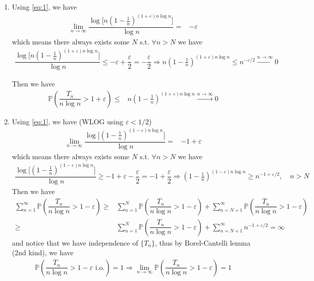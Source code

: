 \documentclass[11pt,a4paper]{article}
\numberwithin{equation}{section}%
\begin{document}
\begin{enumerate}[topsep=2pt,itemsep=0pt]
    \item Using \eqref{eq:1}, we have 
    \begin{align*}
        \lim_{n\to\infty } \dfrac{ \log \big[ n(1-\frac{1}{n})^{(1+\varepsilon  )n\log n} \big] }{ \log n } =& -\varepsilon 
    \end{align*}
    which means there always exists some $ N $ s.t. $ \forall n>N $ we have 
    \begin{align*}
        \dfrac{ \log \big[ n(1-\frac{1}{n})^{(1+\varepsilon  )n\log n} \big] }{ \log n } \leq -\varepsilon + \dfrac{ \varepsilon  }{ 2 } = -\dfrac{ \varepsilon  }{ 2 }  \Rightarrow n(1-\frac{1}{n})^{(1+\varepsilon  )n\log n} \leq n^{-\varepsilon /2} \xrightarrow[]{n\to\infty} 0
    \end{align*}
    
    Then we have
    \begin{align*}
        \mathbb{P}\left( \dfrac{ T_n }{ n\log n } > 1+\varepsilon   \right) \leq & n(1-\frac{1}{n})^{(1+\varepsilon  )n\log n} \xrightarrow[]{n\to\infty} 0 
    \end{align*}

    \item Using \eqref{eq:1}, we have (WLOG using $ \varepsilon <1/2 $)
    \begin{align*}
        \lim_{n\to\infty } \dfrac{ \log \big[ (1-\frac{1}{n})^{(1-\varepsilon  )n\log n} \big] }{ \log n } =& -1+\varepsilon 
    \end{align*}
    which means there always exists some $ N $ s.t. $ \forall n>N $ we have
    \begin{align*}
        \dfrac{ \log \big[ (1-\frac{1}{n})^{(1-\varepsilon  )n\log n} \big] }{ \log n } \geq -1+\varepsilon - \dfrac{ \varepsilon  }{ 2 } = -1 + \dfrac{ \varepsilon  }{ 2 } \Rightarrow (1-\frac{1}{n})^{(1-\varepsilon  )n\log n} \geq n^{-1+\varepsilon /2} ,\quad  n>N
    \end{align*}
    Then we have 
    \begin{align*}
        \sum_{n=1}^\infty \mathbb{P}\left( \dfrac{ T_n }{ n\log n } > 1-\varepsilon  \right) \geq & \sum_{n=1}^N \mathbb{P}\left( \dfrac{ T_n }{ n\log n } > 1-\varepsilon  \right) + \sum_{n=N+1}^\infty \mathbb{P}\left( \dfrac{ T_n }{ n\log n } > 1-\varepsilon  \right) \\
        \geq & \sum_{n=1}^N \mathbb{P}\left( \dfrac{ T_n }{ n\log n } > 1-\varepsilon  \right) + \sum_{n=N+1}^\infty n^{-1+\varepsilon /2} = \infty
    \end{align*}
    and notice that we have independence of $ \{T_n\} $, thus by Borel-Cantelli lemma (2nd kind), we have
    \begin{align*}
        \mathbb{P}\left( \dfrac{ T_n }{ n\log n } > 1-\varepsilon  \text{ i.o.} \right) = 1  \Rightarrow \lim_{n\to\infty} \mathbb{P}\left( \dfrac{ T_n }{ n\log n } > 1-\varepsilon  \right) = 1
    \end{align*}    
\end{enumerate}
\end{document}
